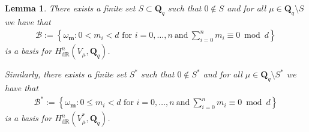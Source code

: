 \documentclass[pdftex]{sigma}
\numberwithin{equation}{section}
\newtheorem{Lemma}[Theorem]{Lemma}
\DeclareMathOperator{\dR}{dR}
\begin{document}
\begin{Lemma}\label{lemBasis} There exists a finite set $S\subset \mathbf{Q}_q$ such that $0\not \in S$ and for all $\mu\in \mathbf{Q}_q\setminus S$ we have that
\begin{gather*}\mathcal{B}:=\left \{\omega_{\mathbf{m}} \colon 0<m_i<d \mbox{ for } i=0,\dots, n \ \text{and} \ \sum_{i=0}^n m_i\equiv 0 \bmod d\right \}\end{gather*}
is a basis for $H^n_{\dR}(V_\mu,\mathbf{Q}_q)$.

Similarly, there exists a finite set $S^*$ such that $0\not \in S^*$ and for all $\mu\in\mathbf{Q}_q\setminus S^*$ we have that
\begin{gather*}\mathcal{B}^*:=\left \{\omega_{\mathbf{m}} \colon 0\leq m_i<d \mbox{ for } i=0,\dots, n \ \text{and} \ \sum_{i=0}^n m_i\equiv 0 \bmod d\right\}\end{gather*}
is a basis for $H^n_{\dR}(V_\mu^*,\mathbf{Q}_q)$.
\end{Lemma}
\end{document}
